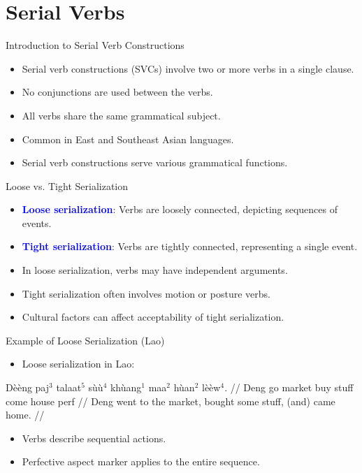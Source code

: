 \documentclass{beamer}
\newcommand{\txx}[1]{\textcolor{blue}{\textbf{#1}}}
\begin{document}
\section{Serial Verbs}

\begin{frame}{Introduction to Serial Verb Constructions}
\begin{itemize}
    \item Serial verb constructions (SVCs) involve two or more verbs in a single clause.
    \item No conjunctions are used between the verbs.
    \item All verbs share the same grammatical subject.
    \item Common in East and Southeast Asian languages.
    \item Serial verb constructions serve various grammatical functions.
\end{itemize}
\end{frame}

\begin{frame}{Loose vs. Tight Serialization}
\begin{itemize}
    \item \txx{Loose serialization}: Verbs are loosely connected, depicting sequences of events.
    \item \txx{Tight serialization}: Verbs are tightly connected, representing a single event.
    \item In loose serialization, verbs may have independent arguments.
    \item Tight serialization often involves motion or posture verbs.
    \item Cultural factors can affect acceptability of tight serialization.
\end{itemize}
\end{frame}

\begin{frame}{Example of Loose Serialization (Lao)}
\begin{itemize}
    \item Loose serialization in Lao:
\end{itemize}
\ex
\begingl
\gla Dèèng paj$^3$ talaat$^5$ sùù$^4$ khùang$^1$ maa$^2$ hùan$^2$ lèèw$^4$. //
\glb Deng go market buy stuff come house perf //
\glft Deng went to the market, bought some stuff, (and) came home. //
\endgl
\xe
\begin{itemize}
    \item Verbs describe sequential actions.
    \item Perfective aspect marker applies to the entire sequence.
\end{itemize}
\end{frame}
\end{document}
